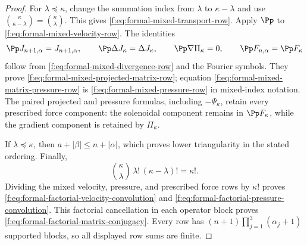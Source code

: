 \begin{proof}
For \(\lambda\preceq\kappa\), change the summation index from \(\lambda\)
to \(\kappa-\lambda\) and use
\(\binom\kappa{\kappa-\lambda}=\binom\kappa\lambda\).  This gives
\eqref{f:eq:formal-mixed-transport-row}.  Apply \(\Pp\) to
\eqref{f:eq:formal-mixed-velocity-row}.  The identities
\[
 \Pp J_{n+1,\alpha}=J_{n+1,\alpha},
 \qquad
 \Pp\Delta J_\kappa=\Delta J_\kappa,
 \qquad
 \Pp\nabla\Pi_\kappa=0,
 \qquad
 \Pp F_{n,\alpha}=\Pp F_\kappa
\]
follow from \eqref{f:eq:formal-mixed-divergence-row} and the Fourier symbols.
They prove \eqref{f:eq:formal-mixed-projected-matrix-row}; equation
\eqref{f:eq:formal-mixed-matrix-pressure-row} is
\eqref{f:eq:formal-mixed-pressure-row} in mixed-index notation.  The paired
projected and pressure formulas, including \(-\Psi_\kappa\), retain every
prescribed force component: the solenoidal component remains in
\(\Pp F_\kappa\), while the gradient component is retained by
\(\Pi_\kappa\).

If \(\lambda\preceq\kappa\), then
\(a+|\beta|\le n+|\alpha|\), which proves lower triangularity in the stated
ordering.  Finally,
\[
 \binom\kappa\lambda\,\lambda!\,(\kappa-\lambda)!=\kappa!.
\]
Dividing the mixed velocity, pressure, and prescribed force rows by
\(\kappa!\) proves
\eqref{f:eq:formal-factorial-velocity-convolution} and
\eqref{f:eq:formal-factorial-pressure-convolution}.  This factorial cancellation in each operator block proves
\eqref{f:eq:formal-factorial-matrix-conjugacy}.  Every row has
\((n+1)\prod_{j=1}^3(\alpha_j+1)\) supported blocks, so all displayed row
sums are finite.
\end{proof}

